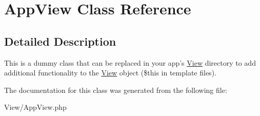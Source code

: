 \hypertarget{classAppView}{
\section{AppView Class Reference}
\label{classAppView}
}


\subsection{Detailed Description}
This is a dummy class that can be replaced in your app's \hyperlink{classView}{View} directory to add additional functionality to the \hyperlink{classView}{View} object (\$this in template files). 

The documentation for this class was generated from the following file:\begin{DoxyCompactItemize}
\item 
View/AppView.php\end{DoxyCompactItemize}
